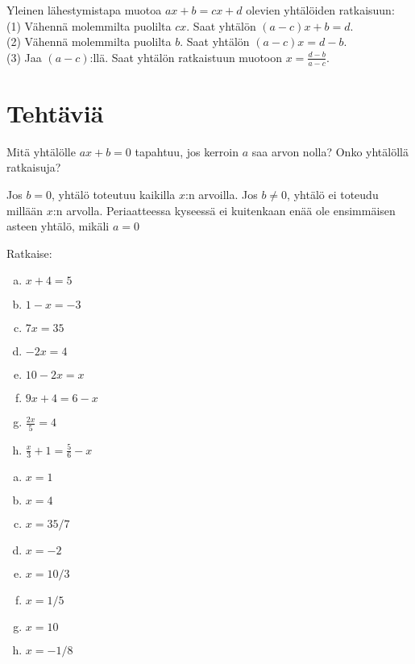 \begin{esimerkki}
Yleinen lähestymistapa muotoa $ax+b = cx+d$ olevien yhtälöiden ratkaisuun: \\
(1) Vähennä molemmilta puolilta $cx$. Saat yhtälön $(a-c)x + b = d$. \\
(2) Vähennä molemmilta puolilta $b$. Saat yhtälön $(a-c)x = d-b$. \\
(3) Jaa $(a-c)$:llä. Saat yhtälön ratkaistuun muotoon $x = \frac{d-b}{a-c}$.
\end{esimerkki}

\section*{Tehtäviä}

\begin{tehtava}
Mitä yhtälölle $ax+b = 0$ tapahtuu, jos kerroin $a$ saa arvon nolla?
Onko yhtälöllä ratkaisuja?
\begin{vastaus}
Jos $b = 0$, yhtälö toteutuu kaikilla $x$:n arvoilla. Jos $b \neq 0$, yhtälö
ei toteudu millään $x$:n arvolla. Periaatteessa kyseessä ei kuitenkaan
enää ole ensimmäisen asteen yhtälö, mikäli $a = 0$
\end{vastaus}
\end{tehtava}

\begin{tehtava}
%
Ratkaise:
\begin{enumerate}[a)]
\item $x + 4 = 5$
\item $1 - x = -3$
\item $7x = 35$
\item $-2x = 4$
\item $10 - 2x = x$
\item $9x + 4 = 6 - x$
\item $\frac{2x}{5} = 4$
\item $\frac{x}{3} + 1 = \frac{5}{6} - x$
\end{enumerate}
\begin{vastaus}
\begin{enumerate}[a)]
\item $x=1$
\item $x=4$
\item $x=35/7$
\item $x=-2$
\item $x=10/3$
\item $x=1/5$
\item $x=10$
\item $x=-1/8$
\end{enumerate}
\end{vastaus}
\end{tehtava}

